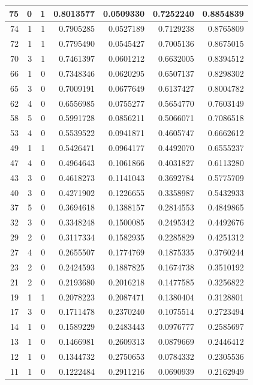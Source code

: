 \documentclass[
]{article}
\begin{document}
\begin{table}[!h]
\begin{tabular}[t]{r|r|r|r|r|r|r}
\hline
75 & 0 & 1 & 0.8013577 & 0.0509330 & 0.7252240 & 0.8854839\\
\hline
74 & 1 & 1 & 0.7905285 & 0.0527189 & 0.7129238 & 0.8765809\\
\hline
72 & 1 & 1 & 0.7795490 & 0.0545427 & 0.7005136 & 0.8675015\\
\hline
70 & 3 & 1 & 0.7461397 & 0.0601212 & 0.6632005 & 0.8394512\\
\hline
66 & 1 & 0 & 0.7348346 & 0.0620295 & 0.6507137 & 0.8298302\\
\hline
65 & 3 & 0 & 0.7009191 & 0.0677649 & 0.6137427 & 0.8004782\\
\hline
62 & 4 & 0 & 0.6556985 & 0.0755277 & 0.5654770 & 0.7603149\\
\hline
58 & 5 & 0 & 0.5991728 & 0.0856211 & 0.5066071 & 0.7086518\\
\hline
53 & 4 & 0 & 0.5539522 & 0.0941871 & 0.4605747 & 0.6662612\\
\hline
49 & 1 & 1 & 0.5426471 & 0.0964177 & 0.4492070 & 0.6555237\\
\hline
47 & 4 & 0 & 0.4964643 & 0.1061866 & 0.4031827 & 0.6113280\\
\hline
43 & 3 & 0 & 0.4618273 & 0.1141043 & 0.3692784 & 0.5775709\\
\hline
40 & 3 & 0 & 0.4271902 & 0.1226655 & 0.3358987 & 0.5432933\\
\hline
37 & 5 & 0 & 0.3694618 & 0.1388157 & 0.2814553 & 0.4849865\\
\hline
32 & 3 & 0 & 0.3348248 & 0.1500085 & 0.2495342 & 0.4492676\\
\hline
29 & 2 & 0 & 0.3117334 & 0.1582935 & 0.2285829 & 0.4251312\\
\hline
27 & 4 & 0 & 0.2655507 & 0.1774769 & 0.1875335 & 0.3760244\\
\hline
23 & 2 & 0 & 0.2424593 & 0.1887825 & 0.1674738 & 0.3510192\\
\hline
21 & 2 & 0 & 0.2193680 & 0.2016218 & 0.1477585 & 0.3256822\\
\hline
19 & 1 & 1 & 0.2078223 & 0.2087471 & 0.1380404 & 0.3128801\\
\hline
17 & 3 & 0 & 0.1711478 & 0.2370240 & 0.1075514 & 0.2723494\\
\hline
14 & 1 & 0 & 0.1589229 & 0.2483443 & 0.0976777 & 0.2585697\\
\hline
13 & 1 & 0 & 0.1466981 & 0.2609313 & 0.0879669 & 0.2446412\\
\hline
12 & 1 & 0 & 0.1344732 & 0.2750653 & 0.0784332 & 0.2305536\\
\hline
11 & 1 & 0 & 0.1222484 & 0.2911216 & 0.0690939 & 0.2162949\\

\end{tabular}
\end{table}
\end{document}
